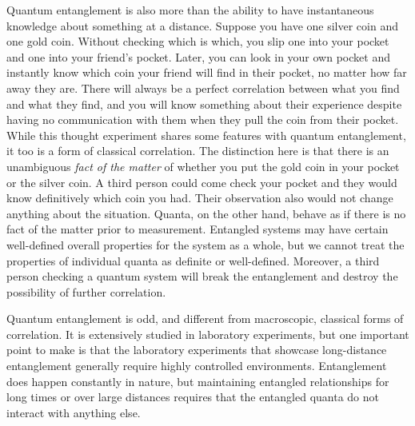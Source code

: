 \documentclass[12pt,onecolumn,preprintnumbers,amsmath,amssymbn,reprint,nofootinbib,superscriptaddress]{revtex4}    %
\begin{document}
Quantum entanglement is also more than the ability to have instantaneous knowledge about something at a distance.  Suppose you have one silver coin and one gold coin.  Without checking which is which, you slip one into your pocket and one into your friend's pocket.  Later, you can look in your own pocket and instantly know which coin your friend will find in their pocket, no matter how far away they are.  There will always be a perfect correlation between what you find and what they find, and you will  know something about their experience despite having no communication with them when they pull the coin from their pocket.  While this thought experiment shares some features with quantum entanglement, it too is a form of classical correlation.  The distinction here is that there is an unambiguous {\em fact of the matter} of whether you put the gold coin in your pocket or the silver coin. A third person could come check your pocket and they would know definitively which coin you had.  Their observation also would not change anything about the situation.  Quanta, on the other hand, behave as if there is no fact of the matter prior to measurement.  Entangled systems may have certain well-defined overall properties for the system as a whole, but we cannot treat the properties of individual quanta as definite or well-defined.  Moreover, a third person checking a quantum system will break the entanglement and destroy the possibility of further correlation.    

Quantum entanglement is odd, and different from macroscopic, classical forms of correlation.  It is extensively studied in laboratory experiments, but one important point to make is that the laboratory experiments that showcase long-distance entanglement generally require highly controlled environments.  Entanglement does happen constantly in nature, but maintaining entangled relationships for long times or over large distances requires that the entangled quanta do not interact with anything else.  
\end{document}
